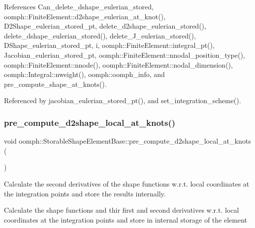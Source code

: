 References Can\+\_\+delete\+\_\+dshape\+\_\+eulerian\+\_\+stored, oomph\+::\+Finite\+Element\+::d2shape\+\_\+eulerian\+\_\+at\+\_\+knot(), D2\+Shape\+\_\+eulerian\+\_\+stored\+\_\+pt, delete\+\_\+d2shape\+\_\+eulerian\+\_\+stored(), delete\+\_\+dshape\+\_\+eulerian\+\_\+stored(), delete\+\_\+\+J\+\_\+eulerian\+\_\+stored(), D\+Shape\+\_\+eulerian\+\_\+stored\+\_\+pt, i, oomph\+::\+Finite\+Element\+::integral\+\_\+pt(), Jacobian\+\_\+eulerian\+\_\+stored\+\_\+pt, oomph\+::\+Finite\+Element\+::nnodal\+\_\+position\+\_\+type(), oomph\+::\+Finite\+Element\+::nnode(), oomph\+::\+Finite\+Element\+::nodal\+\_\+dimension(), oomph\+::\+Integral\+::nweight(), oomph\+::oomph\+\_\+info, and pre\+\_\+compute\+\_\+shape\+\_\+at\+\_\+knots().



Referenced by jacobian\+\_\+eulerian\+\_\+stored\+\_\+pt(), and set\+\_\+integration\+\_\+scheme().

\mbox{\label{classoomph_1_1StorableShapeElementBase_ae710e91d98baf5b83b0ee2557cbd2b3f}} 
\subsubsection{\texorpdfstring{pre\+\_\+compute\+\_\+d2shape\+\_\+local\+\_\+at\+\_\+knots()}{pre\_compute\_d2shape\_local\_at\_knots()}}
{\footnotesize\ttfamily void oomph\+::\+Storable\+Shape\+Element\+Base\+::pre\+\_\+compute\+\_\+d2shape\+\_\+local\+\_\+at\+\_\+knots (\begin{DoxyParamCaption}{ }\end{DoxyParamCaption})}



Calculate the second derivatives of the shape functions w.\+r.\+t. local coordinates at the integration points and store the results internally. 

Calculate the shape functions and thir first and second derivatives w.\+r.\+t. local coordinates at the integration points and store in internal storage of the element 

